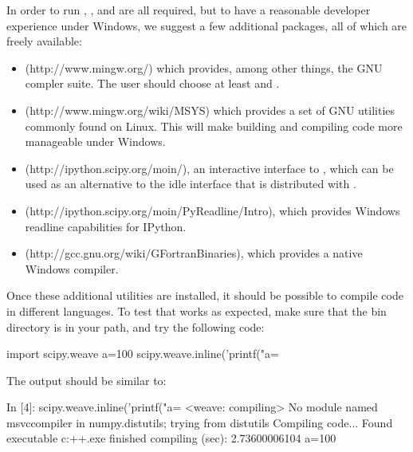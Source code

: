 \documentclass[article]{jss}
\begin{document}
In order to run , ,  and
 are all required, but to have a reasonable developer
experience under Windows, we suggest a few additional packages, all of
which are freely available:
\begin{itemize}
\item {} (http://www.mingw.org/) which provides, among other
  things, the GNU compler suite. The user should choose at least
   and .
\item {} (http://www.mingw.org/wiki/MSYS) which provides a set
  of GNU utilities commonly found on Linux. This will make building
  and compiling code more manageable under Windows.
\item {} (http://ipython.scipy.org/moin/), an interactive
  interface to , which can be used as an alternative
  to the idle interface that is distributed with .
\item {}
  (http://ipython.scipy.org/moin/PyReadline/Intro), which provides
  Windows readline capabilities for IPython.
\item {} (http://gcc.gnu.org/wiki/GFortranBinaries), which
  provides a native Windows  compiler.
\end{itemize}
Once these additional utilities are installed, it should be possible
to compile code in different languages. To test that  works
as expected, make sure that the  bin directory is in your
path, and try the following code:


\begin{Code}
import scipy.weave 
a=100 
scipy.weave.inline('printf("a=%
\end{Code}


The output should be similar to:


\begin{Code}
In [4]: scipy.weave.inline('printf("a=%
<weave: compiling>
No module named msvccompiler in numpy.distutils; trying from distutils
Compiling code...
Found executable c:\mingw\bin\g++.exe
finished compiling (sec):  2.73600006104
a=100
\end{Code}
\end{document}
